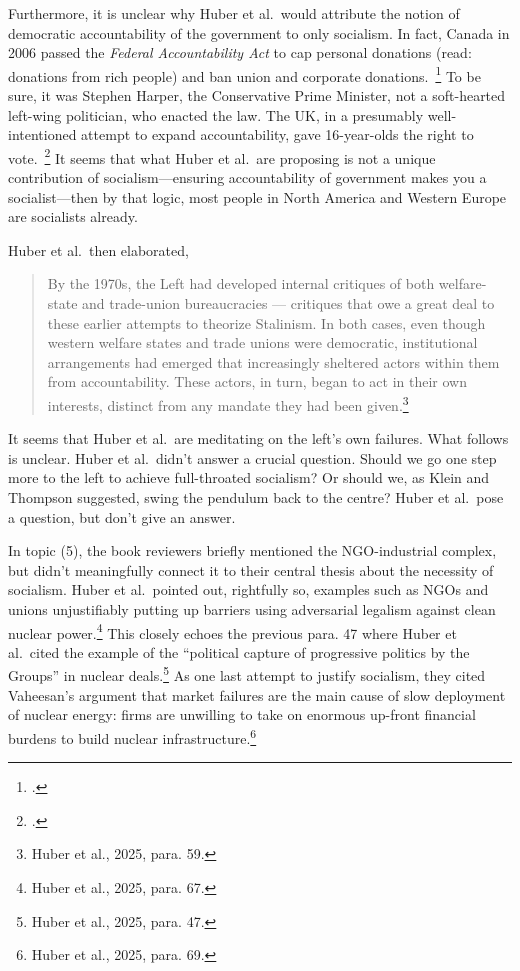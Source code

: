 \documentclass[12pt]{article}
\begin{document}
Furthermore, it is unclear why Huber et al.\ would attribute the notion of democratic accountability of the government to only socialism. In fact, Canada in 2006 passed the \emph{Federal Accountability Act} to cap personal donations (read: donations from rich people) and ban union and corporate donations.~\footcite{governmentofcanadaFederalAccountabilityAct2025} To be sure, it was Stephen Harper, the Conservative Prime Minister, not a soft-hearted left-wing politician, who enacted the law. The UK, in a presumably well-intentioned attempt to expand accountability, gave 16-year-olds the right to vote.~\footcite{ministryofhousingcommunitiesandlocalgovernment16YearOlds2025} It seems that what Huber et al.\ are proposing is not a unique contribution of socialism---ensuring accountability of government makes you a socialist---then by that logic, most people in North America and Western Europe are socialists already.

Huber et al.\ then elaborated,

\begin{quotation}
	By the 1970s, the Left had developed internal critiques of both welfare-state and trade-union bureaucracies — critiques that owe a great deal to these earlier attempts to theorize Stalinism. In both cases, even though western welfare states and trade unions were democratic, institutional arrangements had emerged that increasingly sheltered actors within them from accountability. These actors, in turn, began to act in their own interests, distinct from any mandate they had been given.\footnote{Huber et al., 2025, para. 59.}
\end{quotation}

It seems that Huber et al.\ are meditating on the left's own failures. What follows is unclear. Huber et al.\ didn't answer a crucial question. Should we go one step more to the left to achieve full-throated socialism? Or should we, as Klein and Thompson suggested, swing the pendulum back to the centre? Huber et al.\ pose a question, but don't give an answer.

In topic (5), the book reviewers briefly mentioned the NGO-industrial complex, but didn't meaningfully connect it to their central thesis about the necessity of socialism. Huber et al.\ pointed out, rightfully so, examples such as NGOs and unions unjustifiably putting up barriers using adversarial legalism against clean nuclear power.\footnote{Huber et al., 2025, para. 67.} This closely echoes the previous para. 47 where Huber et al.\ cited the example of the ``political capture of progressive politics by the Groups'' in nuclear deals.\footnote{Huber et al., 2025, para. 47.} As one last attempt to justify socialism, they cited Vaheesan's argument that market failures are the main cause of slow deployment of nuclear energy: firms are unwilling to take on enormous up-front financial burdens to build nuclear infrastructure.\footnote{Huber et al., 2025, para. 69.}
\end{document}
